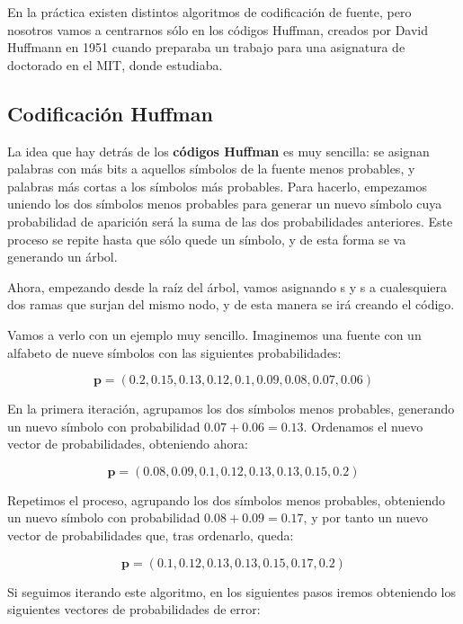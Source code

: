 \documentclass[es,apuntes]{uah}
\begin{document}
En la práctica existen distintos algoritmos de codificación de fuente, pero nosotros vamos a centrarnos sólo en los códigos Huffman, creados por David Huffmann en 1951 cuando preparaba un trabajo para una asignatura de doctorado en el MIT, donde estudiaba.


\subsection{Codificación Huffman}

La idea que hay detrás de los {\bf códigos Huffman} es muy sencilla: se asignan palabras con más bits a aquellos símbolos de la fuente menos probables, y palabras más cortas a los símbolos más probables. Para hacerlo, empezamos uniendo los dos símbolos menos probables para generar un nuevo símbolo cuya probabilidad de aparición será la suma de las dos probabilidades anteriores. Este proceso se repite hasta que sólo quede un símbolo, y de esta forma se va generando un árbol. 


Ahora, empezando desde la raíz del árbol, vamos asignando s y s a cualesquiera dos ramas que surjan del mismo nodo, y de esta manera se irá creando el código. 

Vamos a verlo con un ejemplo muy sencillo. Imaginemos una fuente con un alfabeto de nueve símbolos con las siguientes probabilidades: 

\begin{displaymath}
\mathbf{p} = (0.2, 0.15, 0.13, 0.12, 0.1, 0.09, 0.08, 0.07, 0.06)
\end{displaymath}

En la primera iteración, agrupamos los dos símbolos menos probables, generando un nuevo símbolo con probabilidad $0.07 + 0.06 = 0.13$. Ordenamos el nuevo vector de probabilidades, obteniendo ahora:

\begin{displaymath}
	\mathbf{p} = (0.08, 0.09, 0.1, 0.12, 0.13, 0.13, 0.15, 0.2)
\end{displaymath}

Repetimos el proceso, agrupando los dos símbolos menos probables, obteniendo un nuevo símbolo con probabilidad $0.08 + 0.09 = 0.17$, y por tanto un nuevo vector de probabilidades que, tras ordenarlo, queda:

\begin{displaymath}
	\mathbf{p} = (0.1, 0.12, 0.13, 0.13, 0.15, 0.17, 0.2)
\end{displaymath}

Si seguimos iterando este algoritmo, en los siguientes pasos iremos obteniendo los siguientes vectores de probabilidades de error:
\end{document}
